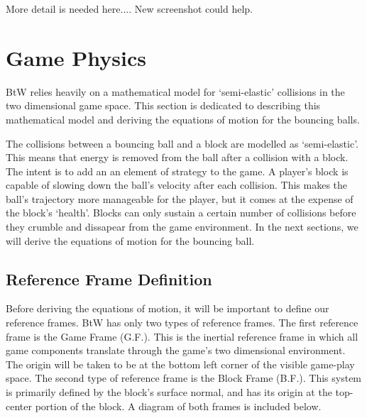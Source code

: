 \documentclass[12pt]{article} %
\begin{document}
More detail is needed here.... New screenshot could help.






\section{Game Physics} %
BtW relies heavily on a mathematical model for `semi-elastic' collisions in the two dimensional
game space. This section is dedicated to describing this mathematical model and deriving the equations
of motion for the bouncing balls.

The collisions between a bouncing ball and a block are modelled as `semi-elastic'. This means
that energy is removed from the ball after a collision with a block. The intent is to add an
an element of strategy to the game. A player's block is capable of slowing
down the ball's velocity after each collision. This makes the ball's trajectory more manageable
for the player, but it comes at the expense of the block's `health'. Blocks can only sustain a certain
number of collisions before they crumble and dissapear from the game environment. In the next
sections, we will derive the equations of motion for the bouncing ball.


\subsection{ Reference Frame Definition} %
Before deriving the equations of motion, it will be important to define our reference frames.
BtW has only two types of reference frames. The first reference frame is the Game Frame (G.F.).
This is the inertial reference frame in which all game components translate through the game's
two dimensional environment. The origin will be taken to be at the bottom left corner of the 
visible game-play space. The second type of reference frame is the Block Frame (B.F.). This system
is primarily defined by the block's surface normal, and has its origin at the top-center portion
of the block. A diagram of both frames is included below.
\end{document}
